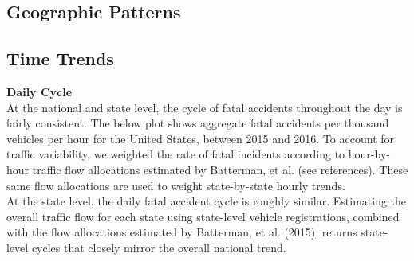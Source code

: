 \documentclass[11pt, oneside,titlepage]{article}   	%
\begin{document}
\subsection*{Geographic Patterns}

\subsection*{Time Trends}
\textbf{Daily Cycle} \\
At the national and state level, the cycle of fatal accidents throughout the day is fairly consistent. The below plot shows aggregate fatal accidents per thousand vehicles per hour for the United States, between 2015 and 2016. To account for traffic variability, we weighted the rate of fatal incidents according to hour-by-hour traffic flow allocations estimated by Batterman, et al. (see references). These same flow allocations are used to weight state-by-state hourly trends. \\

At the state level, the daily fatal accident cycle is roughly similar. Estimating the overall traffic flow for each state using state-level vehicle registrations, combined with the flow allocations estimated by Batterman, et al. (2015), returns state-level cycles that closely mirror the overall national trend.
\end{document}
